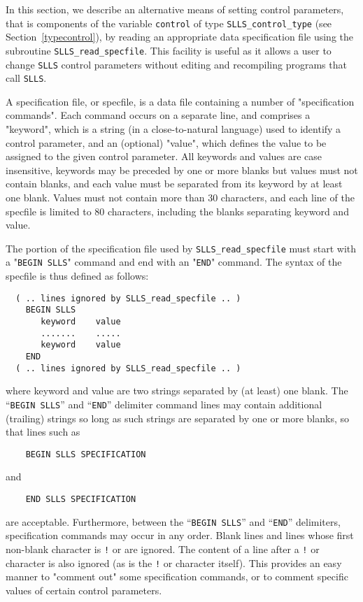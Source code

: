 \documentclass{galahad}
\newcommand{\packagename}{SLLS}
\begin{document}

\galfeatures
\noindent In this section, we describe an alternative means of setting
control parameters, that is components of the variable {\tt control} of type
{\tt \packagename\_control\_type}
(see Section~\ref{typecontrol}),
by reading an appropriate data specification file using the
subroutine {\tt \packagename\_read\_specfile}. This facility
is useful as it allows a user to change  {\tt \packagename} control parameters
without editing and recompiling programs that call {\tt \packagename}.

A specification file, or specfile, is a data file containing a number of
"specification commands". Each command occurs on a separate line,
and comprises a "keyword",
which is a string (in a close-to-natural language) used to identify a
control parameter, and
an (optional) "value", which defines the value to be assigned to the given
control parameter. All keywords and values are case insensitive,
keywords may be preceded by one or more blanks but
values must not contain blanks, and
each value must be separated from its keyword by at least one blank.
Values must not contain more than 30 characters, and
each line of the specfile is limited to 80 characters,
including the blanks separating keyword and value.



The portion of the specification file used by
{\tt \packagename\_read\_specfile}
must start
with a "{\tt BEGIN \packagename}" command and end with an
"{\tt END}" command.  The syntax of the specfile is thus defined as follows:
\begin{verbatim}
  ( .. lines ignored by SLLS_read_specfile .. )
    BEGIN SLLS
       keyword    value
       .......    .....
       keyword    value
    END
  ( .. lines ignored by SLLS_read_specfile .. )
\end{verbatim}
where keyword and value are two strings separated by (at least) one blank.
The ``{\tt BEGIN \packagename}'' and ``{\tt END}'' delimiter command lines
may contain additional (trailing) strings so long as such strings are
separated by one or more blanks, so that lines such as
\begin{verbatim}
    BEGIN SLLS SPECIFICATION
\end{verbatim}
and
\begin{verbatim}
    END SLLS SPECIFICATION
\end{verbatim}
are acceptable. Furthermore,
between the
``{\tt BEGIN \packagename}'' and ``{\tt END}'' delimiters,
specification commands may occur in any order.  Blank lines and
lines whose first non-blank character is {\tt !} or {\tt *} are ignored.
The content
of a line after a {\tt !} or {\tt *} character is also
ignored (as is the {\tt !} or {\tt *}
character itself). This provides an easy manner to "comment out" some
specification commands, or to comment specific values
of certain control parameters.
\end{document}
